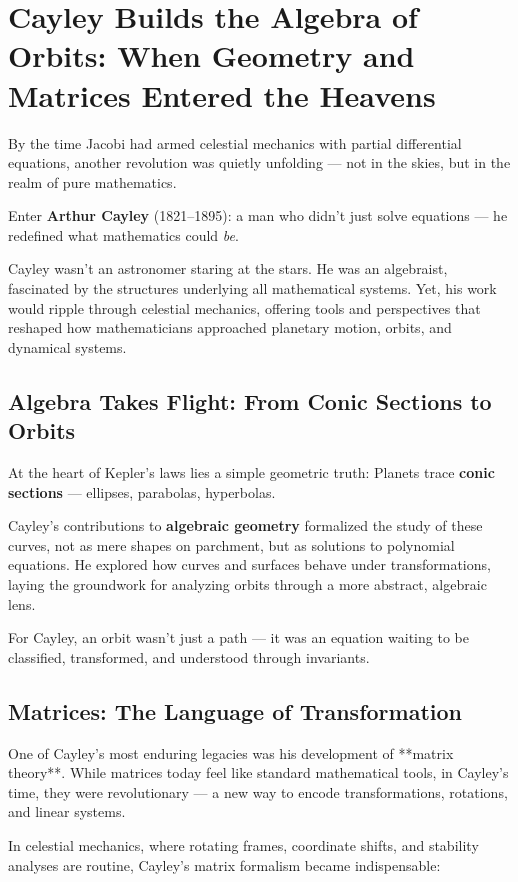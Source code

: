 \section{Cayley Builds the Algebra of Orbits: When Geometry and Matrices Entered the Heavens}

By the time Jacobi had armed celestial mechanics with partial differential equations, another revolution was quietly unfolding — not in the skies, but in the realm of pure mathematics.

Enter \textbf{Arthur Cayley} (1821–1895): a man who didn’t just solve equations — he redefined what mathematics could \emph{be}.

Cayley wasn’t an astronomer staring at the stars. He was an algebraist, fascinated by the structures underlying all mathematical systems. Yet, his work would ripple through celestial mechanics, offering tools and perspectives that reshaped how mathematicians approached planetary motion, orbits, and dynamical systems.

\subsection{Algebra Takes Flight: From Conic Sections to Orbits}

At the heart of Kepler’s laws lies a simple geometric truth:  
Planets trace \textbf{conic sections} — ellipses, parabolas, hyperbolas.

Cayley’s contributions to \textbf{algebraic geometry} formalized the study of these curves, not as mere shapes on parchment, but as solutions to polynomial equations. He explored how curves and surfaces behave under transformations, laying the groundwork for analyzing orbits through a more abstract, algebraic lens.

For Cayley, an orbit wasn’t just a path — it was an equation waiting to be classified, transformed, and understood through invariants.

\subsection{Matrices: The Language of Transformation}

One of Cayley’s most enduring legacies was his development of **matrix theory**. While matrices today feel like standard mathematical tools, in Cayley’s time, they were revolutionary — a new way to encode transformations, rotations, and linear systems.

In celestial mechanics, where rotating frames, coordinate shifts, and stability analyses are routine, Cayley’s matrix formalism became indispensable:

